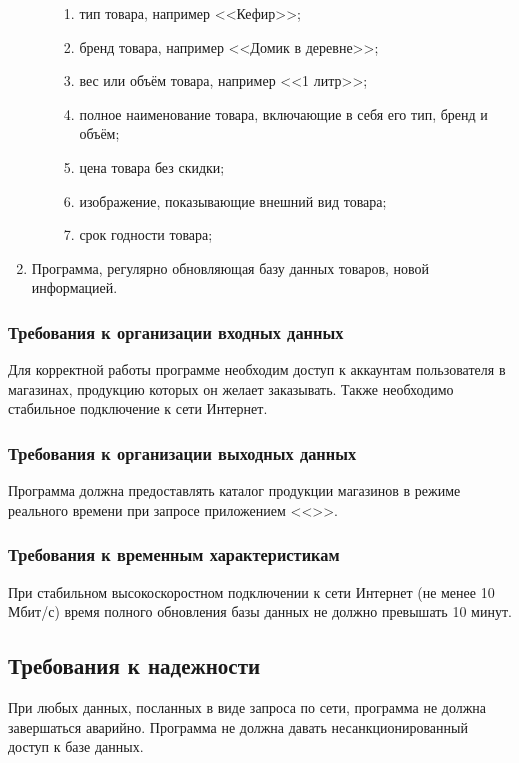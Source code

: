 \documentclass[a4paper,12pt]{article}
\begin{document}
\begin{enumerate}
\begin{enumerate}
\begin{enumerate}
        \item тип товара, например <<Кефир>>;
        \item бренд товара, например <<Домик в деревне>>;
        \item вес или объём товара, например <<1 литр>>;
        \item полное наименование товара, включающие в себя его тип, бренд и объём;
        \item цена товара без скидки;
        \item изображение, показывающие внешний вид товара;
        \item срок годности товара;
      \end{enumerate}
    \end{enumerate}
    \item Программа, регулярно обновляющая базу данных товаров, новой информацией.
  \end{enumerate}

  \subsubsection{Требования к организации входных данных}
  Для корректной работы программе необходим доступ к аккаунтам пользователя в магазинах, продукцию которых он желает заказывать.
  Также необходимо стабильное подключение к сети Интернет.
  \subsubsection{Требования к организации выходных данных}
  Программа должна предоставлять каталог продукции магазинов в режиме реального времени при запросе приложением <<\CRTname>>.
  \subsubsection{Требования к временным характеристикам}
  При стабильном высокоскоростном подключении к сети Интернет (не менее 10 Мбит/с) время полного обновления базы данных
  не должно превышать 10 минут.
  \subsection{Требования к надежности}
  При любых данных, посланных в виде запроса по сети, программа не должна завершаться аварийно.
  Программа не должна давать несанкционированный доступ к базе данных.
\end{document}
